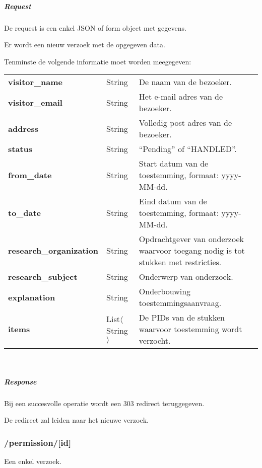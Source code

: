 \documentclass[a4paper,titlepage]{report}
\begin{document}
          \subparagraph{Request}
            De request is een enkel JSON of form object met gegevens.

            Er wordt een nieuw verzoek met de opgegeven data.

            Tenminste de volgende informatie moet worden meegegeven:\\

            \begin{tabular}{ l l p{8cm} }
              \textbf{visitor\_name} & String & De naam van de bezoeker. \\
              \textbf{visitor\_email} & String & Het e-mail adres van de
              bezoeker. \\
              \textbf{address} & String & Volledig post adres van de bezoeker.
              \\
              \textbf{status} & String & ``Pending'' of ``HANDLED''. \\
              \textbf{from\_date} & String & Start datum van de toestemming,
              formaat: yyyy-MM-dd. \\
              \textbf{to\_date} & String & Eind datum van de toestemming,
              formaat: yyyy-MM-dd. \\
              \textbf{research\_organization} & String & Opdrachtgever van
              onderzoek waarvoor toegang nodig is tot stukken met restricties.
              \\
              \textbf{research\_subject} & String & Onderwerp van onderzoek. \\
              \textbf{explanation} & String & Onderbouwing toestemmingsaanvraag.
              \\
              \textbf{items} & List$\langle$String$\rangle$
              & De PIDs van de stukken waarvoor toestemming wordt verzocht.\\
            \end{tabular}\hfill\\

          \subparagraph{Response}
            Bij een succesvolle operatie wordt een 303 redirect teruggegeven.

            De redirect zal leiden naar het nieuwe verzoek.

      \pagebreak
      \subsubsection{/permission/[id]}
      Een enkel verzoek.
\end{document}
